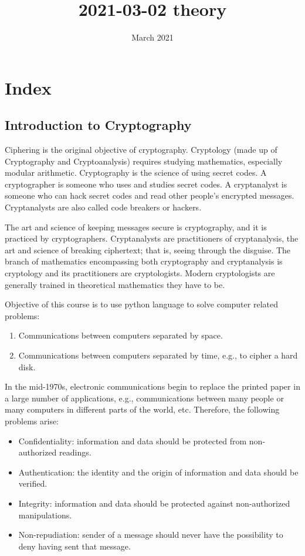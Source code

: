 \documentclass{article}
\title{2021-03-02 theory}
\author{}
\date{March 2021}
\begin{document}
\maketitle

\section{Index}

\subsection{Introduction to Cryptography}
Ciphering is the original objective of cryptography. 
Cryptology (made up of Cryptography and Cryptoanalysis) requires studying mathematics, especially modular arithmetic.
Cryptography is the science of using secret codes. A cryptographer is someone who uses and
studies secret codes. A cryptanalyst is someone who can
hack secret codes and read other people’s encrypted messages. Cryptanalysts are also called code
breakers or hackers.

The art and science of keeping messages secure is cryptography, and it is practiced by
cryptographers. Cryptanalysts are practitioners of cryptanalysis, the art and science
of breaking ciphertext; that is, seeing through the disguise. The branch of mathematics
encompassing both cryptography and cryptanalysis is cryptology and its practitioners
are cryptologists. Modern cryptologists are generally trained in theoretical mathematics
they have to be.

Objective of this course is to use python language to solve computer related problems:
\begin{enumerate}
    \item Communications between computers separated by space.
    \item Communications between computers separated by time, e.g., to cipher a hard disk.
\end{enumerate}

In the mid-1970s, electronic communications begin
to replace the printed paper in a large number
of applications, e.g., communications between many people or many
computers in different parts of the world, etc.
Therefore, the following problems arise:
\begin{itemize}
    \item Confidentiality: information and data should be protected from non-authorized readings.
    \item Authentication: the identity and the origin of information and data should be verified.
    \item Integrity: information and data should be protected against non-authorized manipulations.
    \item Non-repudiation: sender of a message should never have the possibility to deny having sent that message.
\end{itemize}
\end{document}
